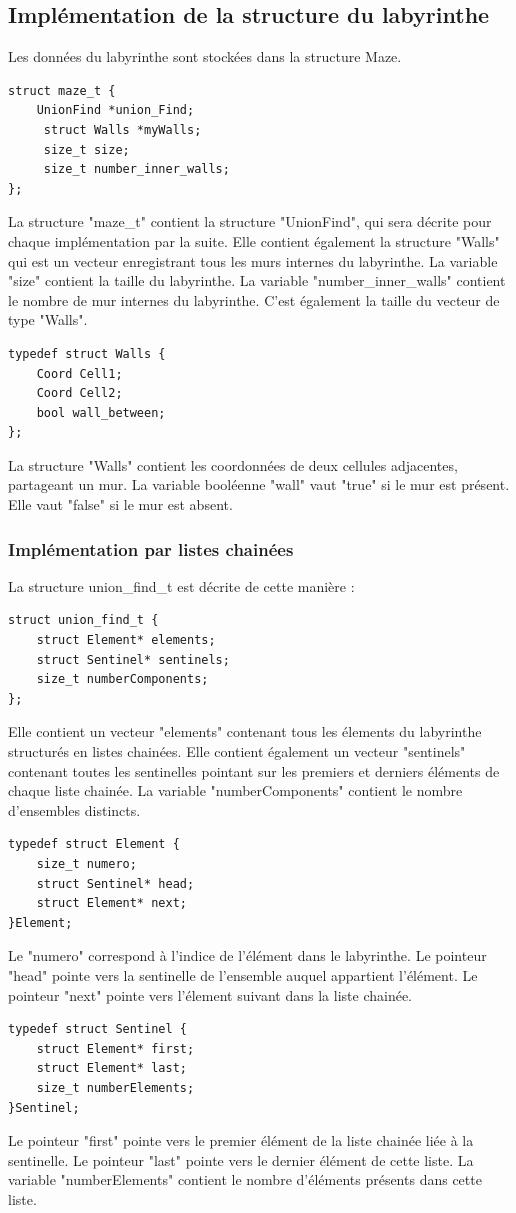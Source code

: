 \documentclass[10pt]{article}
\begin{document}
\subsection{Implémentation de la structure du labyrinthe}
Les données du labyrinthe sont stockées dans la structure Maze.
\begin{lstlisting}[style=CStyle]
struct maze_t {
    UnionFind *union_Find;
     struct Walls *myWalls;
     size_t size;
     size_t number_inner_walls;
};
\end{lstlisting}

La structure "maze\_t" contient la structure "UnionFind", qui sera décrite pour chaque implémentation par la suite. Elle contient également la structure "Walls" qui est un vecteur enregistrant tous les murs internes du labyrinthe. La variable "size" contient la taille du labyrinthe. La variable "number\_inner\_walls" contient le nombre de mur internes du labyrinthe. C'est également la taille du vecteur de type "Walls".
\begin{lstlisting}[style=CStyle]
typedef struct Walls {
    Coord Cell1;
    Coord Cell2;
    bool wall_between;
};
\end{lstlisting}
La structure "Walls" contient les coordonnées de deux cellules adjacentes, partageant un mur. La variable booléenne "wall" vaut "true" si le mur est présent. Elle vaut "false" si le mur est absent.

\subsubsection{Implémentation par listes chainées}
La structure union\_find\_t est décrite de cette manière :
\begin{lstlisting}[style=CStyle]
struct union_find_t {
    struct Element* elements;
    struct Sentinel* sentinels;
    size_t numberComponents;
};
\end{lstlisting}
Elle contient un vecteur "elements" contenant tous les élements du labyrinthe structurés en listes chainées. Elle contient également un vecteur "sentinels" contenant toutes les sentinelles pointant sur les premiers et derniers éléments de chaque liste chainée. La variable "numberComponents" contient le nombre d'ensembles distincts.
\begin{lstlisting}[style=CStyle]
typedef struct Element {
    size_t numero;
    struct Sentinel* head;
    struct Element* next;
}Element;
\end{lstlisting}
Le "numero" correspond à l'indice de l'élément dans le labyrinthe. Le pointeur "head" pointe vers la sentinelle de l'ensemble auquel appartient l'élément. Le pointeur "next" pointe vers l'élement suivant dans la liste chainée.
	\begin{lstlisting}[style=CStyle]
typedef struct Sentinel {
    struct Element* first;
    struct Element* last;
    size_t numberElements;
}Sentinel;
\end{lstlisting}
Le pointeur "first" pointe vers le premier élément de la liste chainée liée à la sentinelle. Le pointeur "last" pointe vers le dernier élément de cette liste. La variable "numberElements" contient le nombre d'éléments présents dans cette liste.
\end{document}

